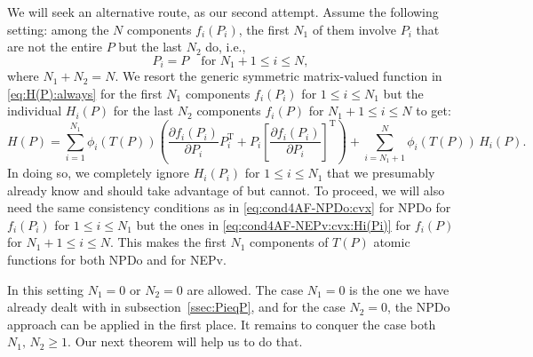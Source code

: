 \documentclass[11pt]{article}
\DeclareMathOperator{\T}{T}
\theoremstyle{definition}
\numberwithin{equation}{section}
\begin{document}
We will seek an alternative route, as our second attempt. Assume the following setting: among the $N$ components
$f_i(P_i)$,
the first $N_1$ of them involve $P_i$ that are not the entire $P$ but
the last $N_2$ do, i.e.,
\begin{equation}\label{eq:mixture-P}
P_i=P\quad\mbox{for $N_1+1\le i\le N$},
\end{equation}
where $N_1+N_2=N$.
We  resort the generic symmetric matrix-valued function in \eqref{eq:H(P):always}
for the first $N_1$ components $f_i(P_i)$ for $1\le i\le N_1$ but the individual $H_i(P)$
for the last $N_2$ components $f_i(P)$ for $N_1+1\le i\le N$ to get:
\begin{equation}\label{eq:H(P)-comp-form:Hi(Pi):alt}
H(P)=\sum_{i=1}^{N_1}\phi_i(T(P))\left(\frac {\partial f_i(P_i)}{\partial P_i}P_i^{\T}
             +P_i\left[\frac {\partial f_i(P_i)}{\partial P_i}\right]^{\T}\right)
             +\sum_{i=N_1+1}^N\phi_i(T(P))\,H_i(P).
\end{equation}
In doing so, we completely ignore $H_i(P_i)$ for $1\le i\le N_1$ that we presumably already know and should take
 advantage of but cannot.
To proceed, we will also need
the same consistency conditions as in \eqref{eq:cond4AF-NPDo:cvx} for NPDo for $f_i(P_i)$ for
$1\le i\le N_1$ but  the ones in \eqref{eq:cond4AF-NEPv:cvx:Hi(Pi)} for $f_i(P)$ for
$N_1+1\le i\le N$. This makes
the first $N_1$ components of $T(P)$ atomic functions for both NPDo and for NEPv.

In this setting $N_1=0$ or $N_2=0$ are allowed. The case $N_1=0$ is the one we have already dealt with
in subsection~\ref{ssec:PieqP}, and for the case $N_2=0$, the NPDo approach can
be applied in the first place.
It remains to conquer the case both $N_1,\,N_2\ge 1$. Our next theorem will help us to do that.
\end{document}
